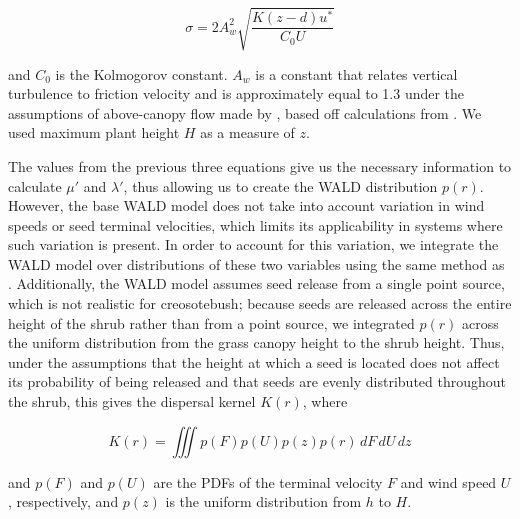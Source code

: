 \documentclass[11pt]{article}\usepackage[]{graphicx}\usepackage[usenames,dvipsnames]{xcolor}
\begin{document}
\begin{linenomath*} \begin{equation} \sigma = 2A_{w}^2 \sqrt{\frac{K(z-d)u^*}{C_{0}U}} \end{equation} 
\end{linenomath*} 

and $C_{0}$ is the Kolmogorov constant.
$A_{w}$ is a constant that relates vertical turbulence to friction velocity and is approximately equal to 1.3 under the assumptions of above-canopy flow made by \citet{skarpaas2007dispersal}, based off calculations from \citet{hsieh1997dissipation}.
We used maximum plant height $H$ as a measure of $z$.

The values from the previous three equations give us the necessary information to calculate $\mu'$ and $\lambda'$, thus allowing us to create the WALD distribution $p(r)$.
However, the base WALD model does not take into account variation in wind speeds or seed terminal velocities, which limits its applicability in systems where such variation is present.
In order to account for this variation, we integrate the WALD model over distributions of these two variables using the same method as \citet{skarpaas2007dispersal}.
Additionally, the WALD model assumes seed release from a single point source, which is not realistic for creosotebush; because seeds are released across the entire height of the shrub rather than from a point source, we integrated $p(r)$ across the uniform distribution from the grass canopy height to the shrub height.
Thus, under the assumptions that the height at which a seed is located does not affect its probability of being released and that seeds are evenly distributed throughout the shrub, this gives the dispersal kernel $K(r)$, where

\begin{linenomath*} \begin{equation} K(r) = \iiint p(F)p(U)p(z)p(r) \,dF\,dU\,dz \end{equation} 
\end{linenomath*} 

and $p(F)$ and $p(U)$ are the PDFs of the terminal velocity $F$ and wind speed $U$, respectively, and $p(z)$ is the uniform distribution from $h$ to $H$.
\end{document}
